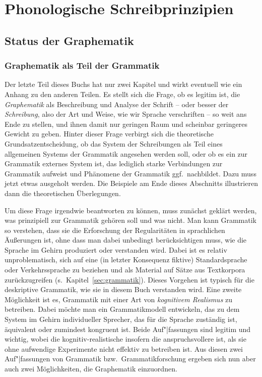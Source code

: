 \chapter{Phonologische Schreibprinzipien}
\label{sec:phonologischeschreibprinzipien}

\section{Status der Graphematik}
\label{sec:statusdergraphematik}

\subsection{Graphematik als Teil der Grammatik}
\label{sec:graphematikalsteildergrammatik}

Der letzte Teil dieses Buchs hat nur zwei Kapitel und wirkt eventuell wie ein Anhang zu den anderen Teilen.
Es stellt sich die Frage, ob es legitim ist, die \textit{Graphematik} als Beschreibung und Analyse der Schrift -- oder besser der \textit{Schreibung}, also der Art und Weise, wie wir Sprache verschriften -- so weit ans Ende zu stellen, und ihnen damit nur geringen Raum und scheinbar geringeres Gewicht zu geben.
Hinter dieser Frage verbirgt sich die theoretische Grundsatzentscheidung, ob das System der Schreibungen als Teil eines allgemeinen Systems der Grammatik angesehen werden soll, oder ob es ein zur Grammatik externes System ist, das lediglich starke Verbindungen zur Grammatik aufweist und Phänomene der Grammatik ggf.\ nachbildet.
Dazu muss jetzt etwas ausgeholt werden.
Die Beispiele am Ende dieses Abschnitts illustrieren dann die theoretischen Überlegungen.

Um diese Frage irgendwie beantworten zu können, muss zunächst geklärt werden, was prinzipiell zur Grammatik gehören soll und was nicht.
Man kann Grammatik so verstehen, dass sie die Erforschung der Regularitäten in sprachlichen Äußerungen ist, ohne dass man dabei unbedingt berücksichtigen muss, wie die Sprache im Gehirn produziert oder verstanden wird.
Dabei ist es relativ unproblematisch, sich auf eine (in letzter Konsequenz fiktive) Standardsprache oder Verkehrssprache zu beziehen und als Material auf Sätze aus Textkorpora zurückzugreifen (s.\ Kapitel~\ref{sec:grammatik}).
Dieses Vorgehen ist typisch für die deskriptive Grammatik, wie sie in diesem Buch verstanden wird.
Eine zweite Möglichkeit ist es, Grammatik mit einer Art von \textit{kognitivem Realismus} zu betreiben.
Dabei möchte man ein Grammatikmodell entwickeln, das zu dem System im Gehirn individueller Sprecher, das für die Sprache zuständig ist, äquivalent oder zumindest kongruent ist.
Beide Auf"|fassungen sind legitim und wichtig, wobei die kognitiv-realistische insofern die anspruchsvollere ist, als sie ohne aufwendige Experimente nicht effektiv zu betreiben ist.
Aus diesen zwei Auf"|fassungen von Grammatik bzw.\ Grammatikforschung ergeben sich nun aber auch zwei Möglichkeiten, die Graphematik einzuordnen.

